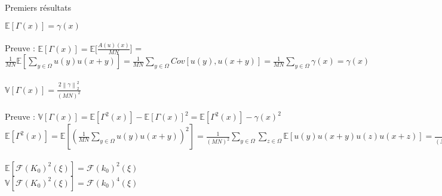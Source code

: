 \documentclass{article} %
\begin{document}
\begin{section}{Premiers résultats}

$\mathbb{E}[\Gamma(x)] = {\gamma}(x) $
\\
\\
Preuve : $ \mathbb{E}[\Gamma(x)] = \mathbb{E}[\frac{A(u)(x)}{MN}$] = $\frac{1}{MN}\mathbb{E}[\sum_{y \in \Omega}u(y)u(x+y)] = \frac{1}{MN}\sum_{y \in \Omega}Cov[u(y),u(x+y)] = \frac{1}{MN}\sum_{y \in \Omega}\gamma(x) = \gamma(x)$
\\
\\
$\mathbb{V}[\Gamma(x)] = \frac{2 {\left\| \gamma \right\|}^2_2}{(MN)^2}$
\\
\\
Preuve : $\mathbb{V}[\Gamma(x)] = \mathbb{E}[\Gamma^2(x)] - \mathbb{E}[\Gamma(x)]^2 = 
\mathbb{E}[\Gamma^2(x)] - {\gamma}(x)^2$
\\
$\mathbb{E}[\Gamma^2(x)] = \mathbb{E}[(\frac{1}{MN}\sum_{y \in \Omega}u(y)u(x+y))^2] = \frac{1}{(MN)^2}\sum_{y \in \Omega}\sum_{z \in \Omega}\mathbb{E}[u(y)u(x+y)u(z)u(x+z)] = 
 \frac{1}{(MN)^2}\sum_{y \in \Omega}\sum{z \in \Omega}\mathbb{E}[\sum_{a \in \Omega}k(a)W(y-a)\sum_{b \in \Omega}k(b)W(x+y-b)\sum_{c \in \Omega}k(c)W(z-c)\sum_{a \in \Omega}k(d)W(x+z-d)] =  
  \frac{1}{(MN)^2}\sum_{y \in \Omega}\sum{z \in \Omega}( \sum_{a \in \Omega}k(a)k(x+a)k(a+z-y)k(a+x+z-y)\mathbb{E}[W(y-a)^4] + \sum_{a \in \Omega}k(a)k(x+a)\mathbb{E}[W(y-a)^2]\sum_{c \in \Omega}k(c)k(x+c)\mathbb{E}[W(z-c)^2] + \sum_{a \in \Omega}k(a)k(a+z-y)\mathbb{E}[W(y-a)^2]\sum_{b \in \Omega}k(b)k(b+z-y)\mathbb{E}[W(x+y-b)^2]+ \sum_{a \in \Omega}k(a)k(a+x+z-y)\mathbb{E}[W(y-a)^2]\sum_{b \in \Omega}k(b)k(b+x+z-y)\mathbb{E}[W(x+y-b)^2] = 
 \frac{1}{(MN)^2}\sum_{y \in \Omega}\sum{z \in \Omega}( \sum_{a \in \Omega}k(a)k(x+a)k(a+z-y)k(a+x+z-y)\mathbb{E}3\sigma^4 + \sum_{a \in \Omega}k(a)k(x+a)\sigma^2\sum_{c \in \Omega}k(c)k(x+c)\sigma^2 + \sum_{a \in \Omega}k(a)k(a+z-y)\sigma^2\sum_{b \in \Omega}k(b)k(b+z-y)\sigma^2+ \sum_{a \in \Omega}k(a)k(a+x+z-y)\sigma^2\sum_{b \in \Omega}k(b)k(b+x+z-y)\sigma^2
 =
 \frac{1}{(MN)^2}\sigma^4\sum_{y \in \Omega}\sum{z \in \Omega}(A(k_0)(x)^2 + A(k_0)(z-y)^2 + A(k_0)(z+x-y)^2) =  
 \gamma(x)^2 +2\sigma^4\frac{1}{(MN)}\sum_{y \in \Omega} A(k)(y)^2 
 = \gamma(x)^2  + \frac{2 {\left\| \gamma \right\|}^2_2}{(MN)^2}$
\\
\\
$\mathbb{E}[\mathcal{F}(K_0)^2(\xi)] = \mathcal{F}({k_0})^2(\xi)$
\\
$\mathbb{V}[\mathcal{F}(K_0)^2(\xi)] = \mathcal{F}({k_0})^4(\xi)$
\\

\end{section}
\end{document}
